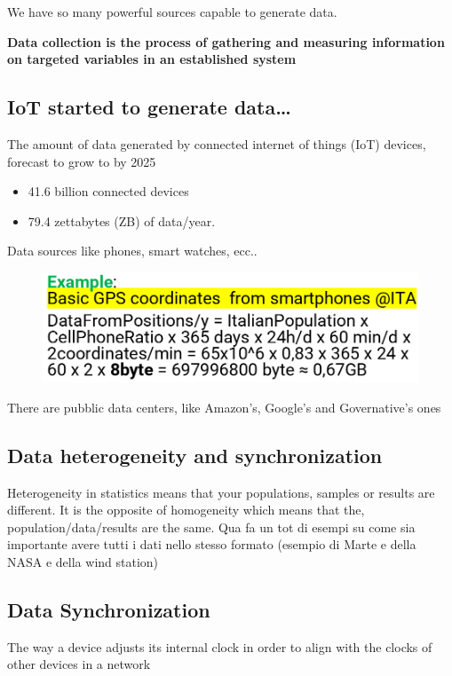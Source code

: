 \noindent We have so many powerful sources capable to generate data.

\noindent \textbf{Data collection is the process of gathering and measuring information on targeted variables in an established system}

\subsection{IoT started to generate data…}
\noindent The amount of data generated by connected internet of things (IoT) devices, forecast to grow to by 2025
\begin{itemize}
    \item 41.6 billion connected devices
    \item 79.4 zettabytes (ZB) of data/year.
\end{itemize} 

\noindent Data sources like phones, smart watches, ecc..

\begin{figure}[H]
    \centering
    \includegraphics[width=0.8\linewidth]{07-08/images/example 1.png}
\end{figure}

\noindent There are pubblic data centers, like Amazon's, Google's and Governative's ones

\subsection{Data heterogeneity and synchronization}
\noindent  Heterogeneity in statistics means that your populations, samples or results are different. It is the opposite of homogeneity which means that the, population/data/results are the same.
Qua fa un tot di esempi  su come sia importante avere tutti i dati nello stesso formato (esempio di Marte e della NASA e della wind station)

\subsection{Data Synchronization}
\noindent The way a device adjusts its internal clock in order to align with the clocks of other devices in a network


